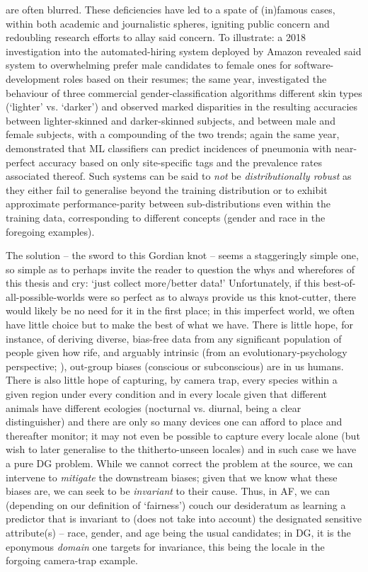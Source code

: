 are often blurred.
%
These deficiencies have led to a spate of (in)famous cases, within both academic and journalistic
spheres, igniting public concern and redoubling research efforts to allay said concern.
%
To illustrate: a 2018 investigation \citep{dastin2018amazon} into the automated-hiring system
deployed by Amazon revealed said system to overwhelming prefer male candidates to female ones for
software-development roles based on their resumes; the same year, \cite{buolamwini2018gender}
investigated the behaviour of three commercial gender-classification algorithms \wrt{} different
skin types (`lighter' vs. `darker') and observed marked disparities in the resulting accuracies
between lighter-skinned and darker-skinned subjects, and between male and female subjects, with a
compounding of the two trends; again the same year, \cite{zech2018variable} demonstrated that
\ac{ML}
classifiers can predict incidences of pneumonia with near-perfect accuracy based on only
site-specific tags and the prevalence rates associated thereof.
%
Such systems can be said to \emph{not} be \emph{distributionally robust} as they either fail to
generalise beyond the training distribution or to exhibit approximate performance-parity between
sub-distributions even within the training data, corresponding to different concepts (gender and
race in the foregoing examples).

%
%
The solution -- the sword to this Gordian knot -- seems a staggeringly simple one, so simple as to
perhaps invite the reader to question the whys and wherefores of this thesis and cry: `just collect
more/better data!'
%
Unfortunately, if this best-of-all-possible-worlds were so perfect as to always provide us this
knot-cutter, there would likely be no need for it in the first place; in this imperfect world, we
often have little choice but to make the best of what we have. 
%
There is little hope, for instance, of deriving diverse, bias-free data from any significant
population of people given how rife, and arguably intrinsic (from an evolutionary-psychology
perspective; \citealp{kurzban2001evolutionary}), out-group biases (conscious or subconscious) are
in us humans.
%
There is also little hope of capturing, by camera trap, every species within a given region under
every condition and in every locale given that different animals have different ecologies
(nocturnal vs. diurnal, being a clear distinguisher) and there are only so many devices one can
afford to place and thereafter monitor; it may not even be possible to capture every locale alone
(but wish to later generalise to the thitherto-unseen locales) and in such case we have a pure
\ac{DG}
problem.
%
While we cannot correct the problem at the source, we can intervene to \emph{mitigate} the
downstream biases; given that we know what these biases are, we can seek to be \emph{invariant} to
their cause.
%
Thus, in \ac{AF}, we can (depending on our definition of `fairness') couch our desideratum as learning a
predictor that is invariant to (does not take into account) the designated sensitive attribute(s)
-- race, gender, and age being the usual candidates; in \ac{DG}, it is the eponymous \emph{domain} one
targets for invariance, this being the locale in the forgoing camera-trap example.

